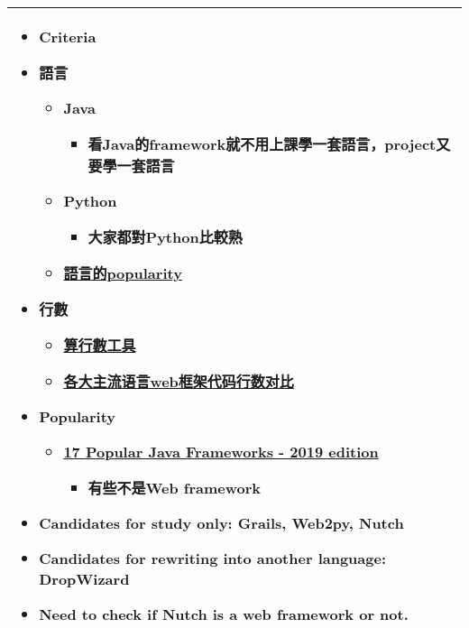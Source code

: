 \documentclass{article}
\begin{document}
\begin{tabularx}{\textwidth}{|X|}
\begin{itemize}
\begin{itemize}
			\item Criteria
			\item 語言
			\begin{itemize}
				\item Java
				\begin{itemize}
					\item 看Java的framework就不用上課學一套語言，project又要學一套語言
				\end{itemize}
				\item Python
				\begin{itemize}
					\item 大家都對Python比較熟
				\end{itemize}
				\item \href{https://www.tiobe.com/tiobe-index/}{語言的popularity}
			\end{itemize}
			\item 行數
			\begin{itemize}
				\item \href{https://codetabs.com/count-loc/count-loc-online.html}{算行數工具}
				\item \href{https://zhuanlan.zhihu.com/p/36450969}{各大主流语言web框架代码行数对比}
			\end{itemize}
			\item Popularity
			\begin{itemize}
				\item \href{https://raygun.com/blog/popular-java-frameworks/}{17 Popular Java Frameworks - 2019 edition}
				\begin{itemize}
					\item 有些不是Web framework
				\end{itemize}
			\end{itemize}
			\item Candidates for study only: Grails, Web2py, Nutch
			\item Candidates for rewriting into another language: DropWizard
			\item Need to check if Nutch is a web framework or not.
		\end{itemize}
	\end{itemize} \\
\hline
\end{tabularx}
\end{document}

